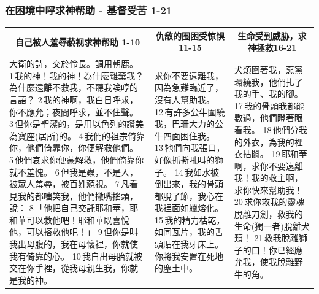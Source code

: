\subsubsection{在困境中呼求神帮助 - 基督受苦 1-21}
\begin{table}[H]
\centering
\begin{tabular}{p{8.25cm}|p{4.25cm}|p{}}\hline\hline
\multicolumn{1}{c|}{自己被人羞辱藐视求神帮助 1-10}&\multicolumn{1}{c}{仇敌的围困受惊惧 11-15}&\multicolumn{1}{c}{生命受到威胁，求神拯救16-21}\\\hline
大衛的詩，交於伶長。調用朝鹿。
1 我的神！我的神！為什麼離棄我？為什麼遠離不救我，不聽我唉哼的言語？
2 我的神啊，我白日呼求，你不應允；夜間呼求，並不住聲。
3 但你是聖潔的，是用以色列的讚美為寶座(居所)的。
4 我們的祖宗倚靠你，他們倚靠你，你便解救他們。
5 他們哀求你便蒙解救，他們倚靠你就不羞愧。
6 但我是蟲，不是人，被眾人羞辱，被百姓藐視。
7 凡看見我的都嗤笑我，他們撇嘴搖頭，說：
8 「他把自己交託耶和華，耶和華可以救他吧！耶和華既喜悅他，可以搭救他吧！」
9 但你是叫我出母腹的，我在母懷裡，你就使我有倚靠的心。
10 我自出母胎就被交在你手裡，從我母親生我，你就是我的神。
&求你不要遠離我，因為急難臨近了，沒有人幫助我。
12 有許多公牛圍繞我，巴珊大力的公牛四面困住我。
13 牠們向我張口，好像抓撕吼叫的獅子。
14 我如水被倒出來，我的骨頭都脫了節，我心在我裡面如蠟熔化。
15 我的精力枯乾，如同瓦片，我的舌頭貼在我牙床上。你將我安置在死地的塵土中。
&犬類圍著我，惡黨環繞我，他們扎了我的手、我的腳。
17 我的骨頭我都能數過，他們瞪著眼看我。
18 他們分我的外衣，為我的裡衣拈鬮。
19 耶和華啊，求你不要遠離我！我的救主啊，求你快來幫助我！
20 求你救我的靈魂脫離刀劍，救我的生命(獨一者)脫離犬類！
21 救我脫離獅子的口！你已經應允我，使我脫離野牛的角。\\\hline
\end{tabular}
\end{table} 


